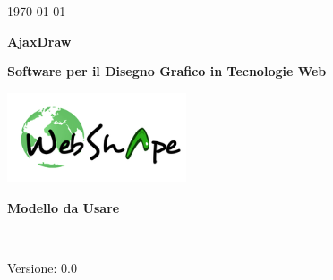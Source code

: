 
\title{\TITOLODOC}
\author{Piero Bizzotto}



\renewcommand{\insertversion}{0.0} %
\renewcommand{\TITOLODOC}{Modello da Usare} %
\renewcommand{\glosspath}{.\glossario} %

\begin{titlepage}
\begin{center}
	\begin{Large}	\today \end{Large}
\end{center}

\vspace{20pt}

\begin{center}
	\begin{Huge}
				\textbf{AjaxDraw}
	\end{Huge}
\end{center}			

\begin{center}
	\begin{large}
				\textbf{Software per il Disegno Grafico in Tecnologie Web}
	\end{large}
\end{center}			

\vspace{20pt}

\begin{center}
\includegraphics[width=150pt]{../logo/logo}
\end{center}

\vspace{170pt}
\begin{center} %
	\begin{Huge}
				\textbf{\TITOLODOC}
	\end{Huge}
			\\
\end{center}
\vspace{210pt}
\begin{center}
Versione: \insertversion
\end{center}
\end{titlepage}

